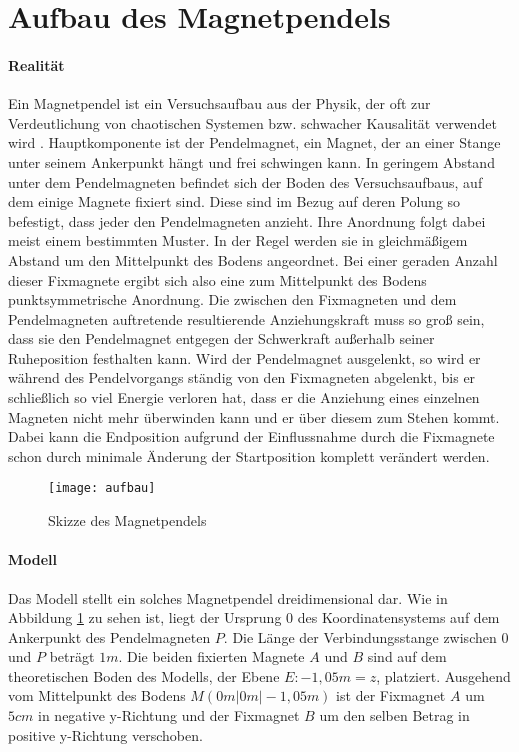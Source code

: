 \section{Aufbau des Magnetpendels}
\label{sec:aufbau_des_magnetpendels}

\paragraph{Realität} Ein Magnetpendel ist ein Versuchsaufbau aus der Physik, der oft zur Verdeutlichung von chaotischen Systemen bzw. schwacher Kausalität verwendet wird . Hauptkomponente ist der Pendelmagnet, ein Magnet, der an einer Stange unter seinem Ankerpunkt hängt und frei schwingen kann. In geringem Abstand unter dem Pendelmagneten befindet sich der Boden des Versuchsaufbaus, auf dem einige Magnete fixiert sind. Diese sind im Bezug auf deren Polung so befestigt, dass jeder den Pendelmagneten anzieht. Ihre Anordnung folgt dabei meist einem bestimmten Muster. In der Regel werden sie in gleichmäßigem Abstand um den Mittelpunkt des Bodens angeordnet. Bei einer geraden Anzahl dieser Fixmagnete ergibt sich also eine zum Mittelpunkt des Bodens punktsymmetrische Anordnung. Die zwischen den Fixmagneten und dem Pendelmagneten auftretende resultierende Anziehungskraft muss so groß sein, dass sie den Pendelmagnet entgegen der Schwerkraft außerhalb seiner Ruheposition festhalten kann. Wird der Pendelmagnet ausgelenkt, so wird er während des Pendelvorgangs ständig von den Fixmagneten abgelenkt, bis er schließlich so viel Energie verloren hat, dass er die Anziehung eines einzelnen Magneten nicht mehr überwinden kann und er über diesem zum Stehen kommt. Dabei kann die Endposition aufgrund der Einflussnahme durch die Fixmagnete schon durch minimale Änderung der Startposition komplett verändert werden.

\begin{figure}
    \texttt{[image: aufbau]}
	\caption{Skizze des Magnetpendels}
    \label{fig:skizze_des_magnetpendels}
\end{figure}

\paragraph{Modell} Das Modell stellt ein solches Magnetpendel dreidimensional dar. Wie in Abbildung \ref{fig:skizze_des_magnetpendels} zu sehen ist, liegt der Ursprung $0$ des Koordinatensystems auf dem Ankerpunkt des Pendelmagneten $P$. Die Länge der Verbindungsstange zwischen $0$ und $P$ beträgt $1m$. Die beiden fixierten Magnete $A$ und $B$ sind auf dem theoretischen Boden des Modells, der Ebene $E: -1,05m = z$, platziert. Ausgehend vom Mittelpunkt des Bodens $M(0m|0m|-1,05m)$ ist der Fixmagnet $A$ um $5cm$ in negative y-Richtung und der Fixmagnet $B$ um den selben Betrag in positive y-Richtung verschoben.

